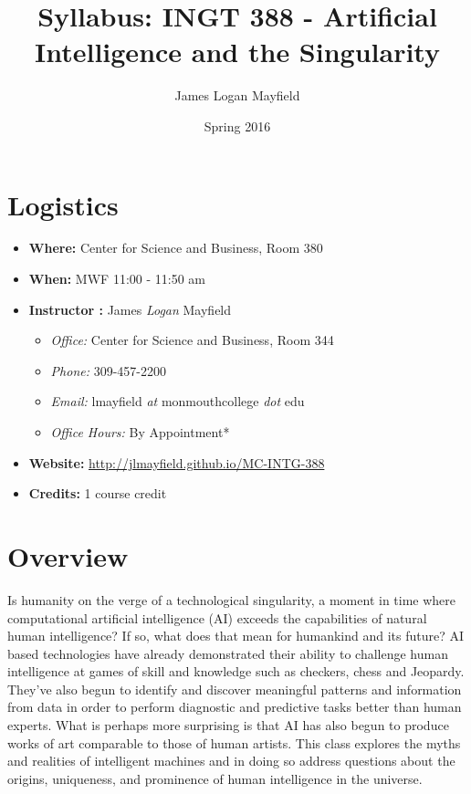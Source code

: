 \documentclass[]{tufte-handout}
\title{Syllabus: INGT 388 - Artificial Intelligence and the Singularity}
\author{James Logan Mayfield }
\date{ Spring 2016 }
\begin{document}
\maketitle

\section{Logistics}
\begin{itemize}
\item \textbf{Where: } Center for Science and Business, Room 380
\item \textbf{When: } MWF 11:00 - 11:50 am
\item \textbf{Instructor :} James \textit{Logan} Mayfield
\begin{itemize}
\item \textit{Office: } Center for Science and Business, Room 344
\item \textit{Phone: } 309-457-2200
\item \textit{Email: } lmayfield \textit{at} monmouthcollege \textit{dot} edu
\item \textit{Office Hours: } By Appointment*
\end{itemize}
\item \textbf{Website: } \url{http://jlmayfield.github.io/MC-INTG-388}
\item \textbf{Credits: } 1 course credit
\end{itemize}

\section{Overview}

Is humanity on the verge of a technological singularity, a moment in time where computational artificial intelligence (AI) exceeds the capabilities of natural human intelligence?  If so, what does that mean for humankind and its future? AI based technologies have already demonstrated their ability to challenge human intelligence at games of skill and knowledge such as checkers, chess and Jeopardy. They've also begun to identify and discover meaningful patterns and information from data in order to perform diagnostic and predictive tasks better than human experts.  What is perhaps more surprising is that AI has also begun to produce works of art comparable to those of human artists. This class explores the myths and realities of intelligent machines and in doing so address questions about the origins, uniqueness, and prominence of human intelligence in the universe.     
\end{document}
